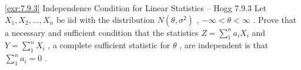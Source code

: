 \begin{exercise}{\ref{exr:7.9.3} Independence Condition for Linear Statistics – Hogg 7.9.3}\label{exr:7.9.3}
Let $X_{1}, X_{2}, \ldots, X_{n}$ be iid with the distribution $N(\theta, \sigma^2)$ , $-\infty < \theta < \infty$ . Prove that a necessary and sufficient condition that the statistics $Z = \sum_{1}^{n} a_{i} X_{i}$ and $Y = \sum_{1}^{n} X_{i}$ , a complete sufficient statistic for $\theta$ , are independent is that $\sum_{1}^{n} a_{i} = 0$ .
\end{exercise}

